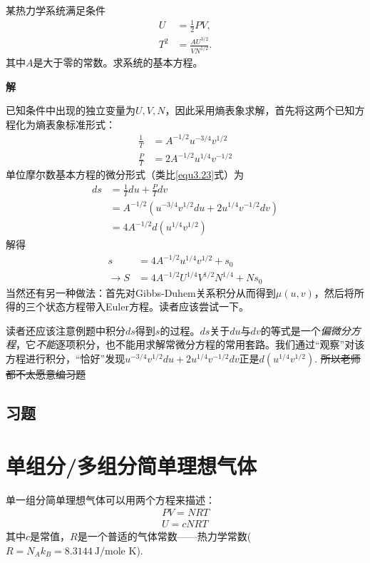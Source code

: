 \begin{example}

某热力学系统满足条件
\begin{align*}
    U &= \frac{1}{2} PV, \\
    T^2 &= \frac{AU^{3/2}}{VN^{1/2}}.
\end{align*}
其中$A$是大于零的常数。求系统的基本方程。

{\bf 解}

已知条件中出现的独立变量为$U, V, N$，因此采用熵表象求解，首先将这两个已知方程化为熵表象标准形式：
\begin{align*}
    \frac{1}{T} &= A^{-1/2} u^{-3/4} v^{1/2} \\
    \frac{P}{T} &= 2A^{-1/2} u^{1/4} v^{-1/2}
\end{align*}
单位摩尔数基本方程的微分形式（类比\eqref{equ3.23}式）为
\begin{align*}
    ds &= \frac{1}{T} du + \frac{P}{T} dv \\
    &= A^{-1/2} (u^{-3/4} v^{1/2} du + 2u^{1/4} v^{-1/2} dv) \\
    &= 4A^{-1/2} d(u^{1/4} v^{1/2})
\end{align*}
解得
\begin{align*}
    s &= 4A^{-1/2} u^{1/4} v^{1/2} + s_0 \\
    \to S &= 4A^{-1/2} U^{1/4} V^{1/2} N^{1/4} + Ns_0
\end{align*}
当然还有另一种做法：首先对Gibbs-Duhem关系积分从而得到$\mu (u, v)$，然后将所得的三个状态方程带入Euler方程。读者应该尝试一下。

读者还应该注意例题中积分$ds$得到$s$的过程。$ds$关于$du$与$dv$的等式是一个{\it 偏微分方程}，它{\it 不能}逐项积分，也不能用求解常微分方程的常用套路。我们通过“观察”对该方程进行积分，“恰好”发现$u^{-3/4} v^{1/2} du + 2u^{1/4} v^{-1/2} dv$正是$d(u^{1/4} v^{1/2})$. \sout{所以老师都不太愿意编习题}

\end{example}

\subsection*{习题}


\section{单组分/多组分简单理想气体}
\label{sec3.4}

单一组分简单理想气体可以用两个方程来描述：
\begin{align}
PV=NRT \label{equ3.25}\\
U=cNRT \label{equ3.26}
\end{align}
其中$c$是常值，$R$是一个普适的气体常数——热力学常数($R=N_Ak_B=8.3144\ \text{J/mole K}$).

